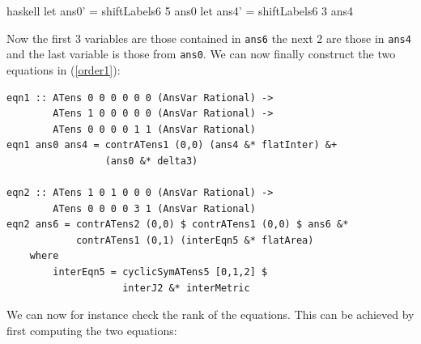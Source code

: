 \documentclass[a4paper,12pt, DIV=14, BCOR=5mm, twoside, headsepline]{scrbook}
\begin{document}
\begin{center}
\begin{cminted}{haskell}
let ans0' = shiftLabels6 5 ans0
let ans4' = shiftLabels6 3 ans4 
\end{cminted}
\end{center}

Now the first 3 variables are those contained in \texttt{ans6} the next 2 are those in \texttt{ans4} and the last variable is those from \texttt{ans0}.
We can now finally construct the two equations in (\ref{order1}):

\begin{samepage}
\begin{verbatim}
eqn1 :: ATens 0 0 0 0 0 0 (AnsVar Rational) ->
        ATens 1 0 0 0 0 0 (AnsVar Rational) ->
        ATens 0 0 0 0 1 1 (AnsVar Rational)
eqn1 ans0 ans4 = contrATens1 (0,0) (ans4 &* flatInter) &+
                 (ans0 &* delta3)
                 
eqn2 :: ATens 1 0 1 0 0 0 (AnsVar Rational) ->
        ATens 0 0 0 0 3 1 (AnsVar Rational)
eqn2 ans6 = contrATens2 (0,0) $ contrATens1 (0,0) $ ans6 &*
            contrATens1 (0,1) (interEqn5 &* flatArea)
    where 
        interEqn5 = cyclicSymATens5 [0,1,2] $
                    interJ2 &* interMetric
\end{verbatim} 
\end{samepage}

We can now for instance check the rank of the equations. This can be achieved by first computing the two equations:
\end{document}
